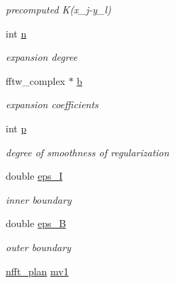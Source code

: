 \begin{CompactItemize}
\begin{CompactList}\small\item\em precomputed K(x\_\-j-y\_\-l) \item\end{CompactList}\item 
\hypertarget{structfastsum__plan___o11}{
int \hyperlink{structfastsum__plan___o11}{n}}
\label{structfastsum__plan___o11}

\begin{CompactList}\small\item\em expansion degree \item\end{CompactList}\item 
\hypertarget{structfastsum__plan___o12}{
fftw\_\-complex $\ast$ \hyperlink{structfastsum__plan___o12}{b}}
\label{structfastsum__plan___o12}

\begin{CompactList}\small\item\em expansion coefficients \item\end{CompactList}\item 
\hypertarget{structfastsum__plan___o13}{
int \hyperlink{structfastsum__plan___o13}{p}}
\label{structfastsum__plan___o13}

\begin{CompactList}\small\item\em degree of smoothness of regularization \item\end{CompactList}\item 
\hypertarget{structfastsum__plan___o14}{
double \hyperlink{structfastsum__plan___o14}{eps\_\-I}}
\label{structfastsum__plan___o14}

\begin{CompactList}\small\item\em inner boundary \item\end{CompactList}\item 
\hypertarget{structfastsum__plan___o15}{
double \hyperlink{structfastsum__plan___o15}{eps\_\-B}}
\label{structfastsum__plan___o15}

\begin{CompactList}\small\item\em outer boundary \item\end{CompactList}\item 
\hypertarget{structfastsum__plan___o16}{
\hyperlink{structnfft__plan}{nfft\_\-plan} \hyperlink{structfastsum__plan___o16}{mv1}}
\label{structfastsum__plan___o16}


\end{CompactItemize}
